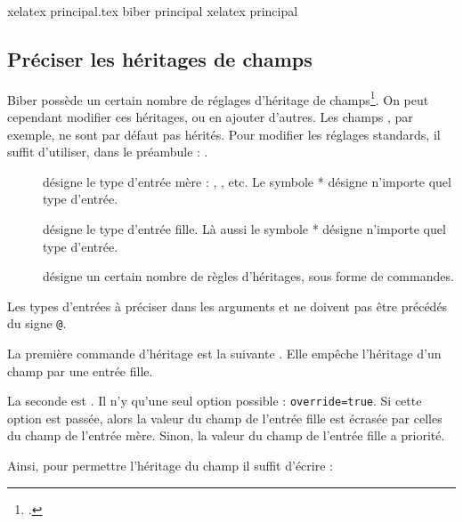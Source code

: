 \begin{bashcode}
xelatex principal.tex
biber principal
xelatex principal
\end{bashcode}

\subsection{Préciser les héritages de champs}

Biber possède un certain nombre de réglages d'héritage de champs\footcite{biblatex_crossrefsetup}. On peut cependant modifier ces héritages, ou en ajouter d'autres. Les champs , par exemple, ne sont par défaut pas hérités. 
Pour modifier les réglages standards, il suffit d'utiliser, dans le préambule  :
.

\begin{description}
\item[] désigne le type d'entrée mère : , , etc. Le symbole * désigne n'importe quel type d'entrée.
\item[] désigne le type d'entrée fille. Là aussi le symbole * désigne n'importe quel type d'entrée.
\item[] désigne un certain nombre de règles d'héritages, sous forme de commandes.
\end{description}

Les types d'entrées à préciser dans les arguments  et  ne doivent pas être précédés du signe \verb|@|.

La première commande d'héritage est la suivante .
Elle empêche l'héritage d'un champ par une entrée fille.

La seconde  est 
.
Il n'y qu'une seul option possible : \verb|override=true|. Si cette option est passée, alors la valeur du champ de l'entrée fille est écrasée par celles du champ de l'entrée mère. Sinon, la valeur  du champ de l'entrée fille a priorité.

Ainsi, pour permettre l'héritage du  champ  il suffit d'écrire :

\begin{latexcode}
\end{latexcode}

